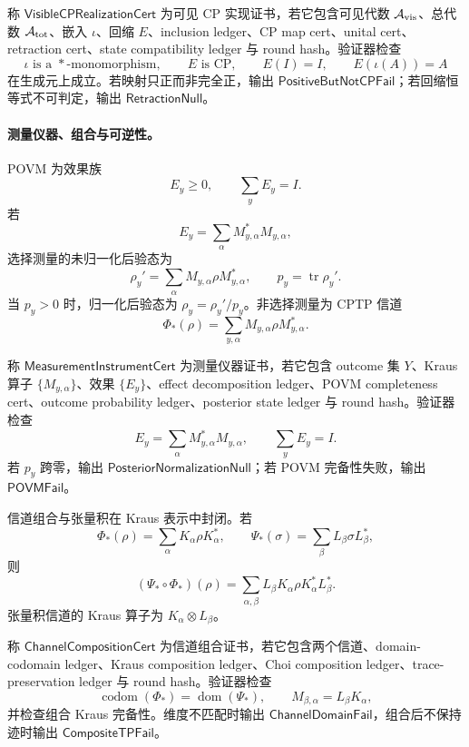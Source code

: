 \begin{definition}[可见完全正实现证书]\label{def:typed-address-biaxial-completion-visible-cp-realization-cert}
称 \(\mathsf{VisibleCPRealizationCert}\) 为可见 CP 实现证书，若它包含可见代数 \(\mathcal A_{\rm vis}\)、总代数 \(\mathcal A_{\rm tot}\)、嵌入 \(\iota\)、回缩 \(E\)、inclusion ledger、CP map cert、unital cert、retraction cert、state compatibility ledger 与 round hash。验证器检查
\[
\iota\text{ is a }*\text{-monomorphism},
\qquad
E\text{ is CP},
\qquad
E(I)=I,
\qquad
E(\iota(A))=A
\]
在生成元上成立。若映射只正而非完全正，输出 \(\mathsf{PositiveButNotCPFail}\)；若回缩恒等式不可判定，输出 \(\mathsf{RetractionNull}\)。
\end{definition}

\paragraph{测量仪器、组合与可逆性。}
POVM 为效果族
\[
E_y\ge0,
\qquad
\sum_yE_y=I.
\]
若
\[
E_y=\sum_\alpha M_{y,\alpha}^*M_{y,\alpha},
\]
选择测量的未归一化后验态为
\[
\rho_y'=
\sum_\alpha M_{y,\alpha}\rho M_{y,\alpha}^*,
\qquad
p_y=\operatorname{tr}\rho_y'.
\]
当 \(p_y>0\) 时，归一化后验态为 \(\rho_y=\rho_y'/p_y\)。非选择测量为 CPTP 信道
\[
\Phi_{\ast}(\rho)=
\sum_{y,\alpha}M_{y,\alpha}\rho M_{y,\alpha}^*.
\]

\begin{definition}[测量仪器证书]\label{def:typed-address-biaxial-completion-measurement-instrument-cert}
称 \(\mathsf{MeasurementInstrumentCert}\) 为测量仪器证书，若它包含 outcome 集 \(Y\)、Kraus 算子 \(\{M_{y,\alpha}\}\)、效果 \(\{E_y\}\)、effect decomposition ledger、POVM completeness cert、outcome probability ledger、posterior state ledger 与 round hash。验证器检查
\[
E_y=\sum_\alpha M_{y,\alpha}^*M_{y,\alpha},
\qquad
\sum_yE_y=I.
\]
若 \(p_y\) 跨零，输出 \(\mathsf{PosteriorNormalizationNull}\)；若 POVM 完备性失败，输出 \(\mathsf{POVMFail}\)。
\end{definition}

信道组合与张量积在 Kraus 表示中封闭。若
\[
\Phi_{\ast}(\rho)=\sum_\alpha K_\alpha\rho K_\alpha^*,
\qquad
\Psi_{\ast}(\sigma)=\sum_\beta L_\beta\sigma L_\beta^*,
\]
则
\[
(\Psi_{\ast}\circ\Phi_{\ast})(\rho)
=
\sum_{\alpha,\beta}
L_\beta K_\alpha\rho K_\alpha^*L_\beta^*.
\]
张量积信道的 Kraus 算子为 \(K_\alpha\otimes L_\beta\)。

\begin{definition}[信道组合证书]\label{def:typed-address-biaxial-completion-channel-composition-cert}
称 \(\mathsf{ChannelCompositionCert}\) 为信道组合证书，若它包含两个信道、domain-codomain ledger、Kraus composition ledger、Choi composition ledger、trace-preservation ledger 与 round hash。验证器检查
\[
\operatorname{codom}(\Phi_{\ast})=\operatorname{dom}(\Psi_{\ast}),
\qquad
M_{\beta,\alpha}=L_\beta K_\alpha,
\]
并检查组合 Kraus 完备性。维度不匹配时输出 \(\mathsf{ChannelDomainFail}\)，组合后不保持迹时输出 \(\mathsf{CompositeTPFail}\)。
\end{definition}

